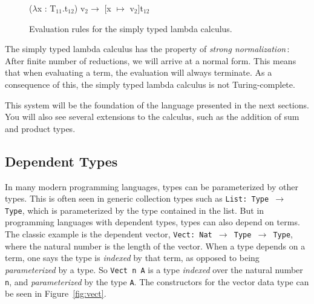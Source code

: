 \begin{center}
\begin{figure}

\begin{prooftree}
\end{prooftree}

\begin{prooftree}
\end{prooftree}

\begin{center}
($\lambda$x : T$_{11}$.t$_{12}$) v$_{2} \to$ [x $\mapsto$ v$_{2}$]t$_{12}$ 
\end{center}

\caption{Evaluation rules for the simply typed lambda calculus.}
\label{fig:simple-evaluation-rules}

\end{figure}
\end{center}

The simply typed lambda calculus has the property of \emph{strong normalization}\,\cite[pp. 149]{Pierce:TypeSystems}: After finite number of reductions, we will arrive at a normal form. This means that when evaluating a term, the evaluation will always terminate. As a consequence of this, the simply typed lambda calculus is not Turing-complete.

This system will be the foundation of the language presented in the next sections. You will also see several extensions to the calculus, such as the addition of sum and product types.

\subsection{Dependent Types}
\label{sec:dependent-types-idris}
In many modern programming languages, types can be parameterized by other types. This is often seen in generic collection types such as \texttt{List: Type $\to$ Type}, which is parameterized by the type contained in the list. But in programming languages with dependent types, types can also depend on terms. The classic example is the dependent vector, \texttt{Vect: Nat $\to$ Type $\to$ Type}, where the natural number is the length of the vector. When a type depends on a term, one says the type is \emph{indexed} by that term, as opposed to being \emph{parameterized} by a type. So \texttt{Vect n A} is a type \emph{indexed} over the natural number \texttt{n}, and \emph{parameterized} by the type \texttt{A}. The constructors for the vector data type can be seen in Figure~\ref{fig:vect}.

